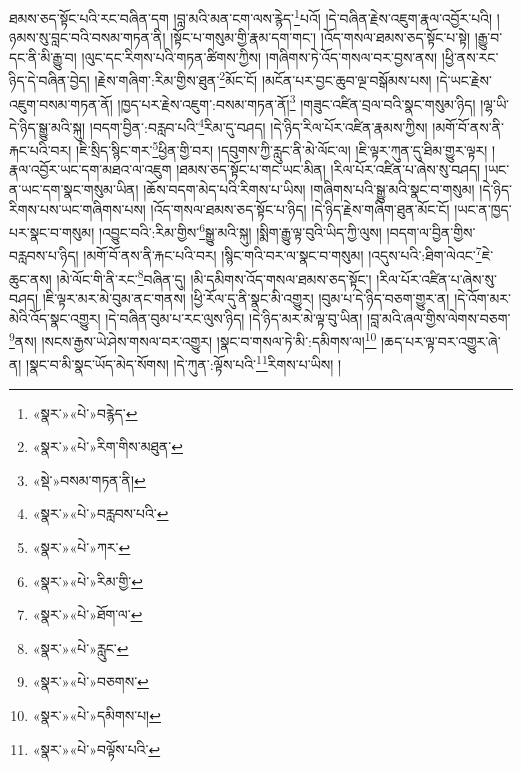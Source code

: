 ཐམས་ཅད་སྟོང་པའི་རང་བཞིན་དག །བླ་མའི་མན་ངག་ལས་རྙེད་\footnote{«སྣར་»«པེ་»བརྙེད་}པའོ། །དེ་བཞིན་རྗེས་འཇུག་རྣལ་འབྱོར་པའི། །ཉམས་སུ་བླང་བའི་བསམ་གཏན་ནི། །སྟོང་པ་གསུམ་གྱི་རྣམ་དག་གང་། །འོད་གསལ་ཐམས་ཅད་སྟོང་པ་སྟེ། །རྒྱུ་བ་དང་ནི་མི་རྒྱུ་བ། །ལུང་དང་རིགས་པའི་གཏན་ཚིགས་ཀྱིས། །གཞིགས་ཏེ་འོད་གསལ་བར་བྱས་ནས། །ཕྱི་ནས་རང་ཉིད་དེ་བཞིན་བྱེད། །རྗེས་གཞིག་:རིམ་གྱིས་ཐུན་\footnote{«སྣར་»«པེ་»རིག་གིས་མཐུན་}མོང་ངོ། །མངོན་པར་བྱང་ཆུབ་ལྔ་བསྒོམས་པས། །དེ་ཡང་རྗེས་འཇུག་བསམ་གཏན་ནོ། །ཁྱད་པར་རྗེས་འཇུག་:བསམ་གཏན་ནོ།\footnote{«སྡེ་»བསམ་གཏན་ནི།} །གཟུང་འཛིན་བྲལ་བའི་སྣང་གསུམ་ཉིད། །ལྷ་ཡི་དེ་ཉིད་སྒྱུ་མའི་སྐུ། །བདག་བྱིན་:བརླབ་པའི་\footnote{«སྣར་»«པེ་»བརླབས་པའི་}རིམ་དུ་བཤད། །དེ་ཉིད་རིལ་པོར་འཛིན་རྣམས་ཀྱིས། །མགོ་བོ་ནས་ནི་རྐང་པའི་བར། །ཇི་སྲིད་སྙིང་གར་\footnote{«སྣར་»«པེ་»ཀར་}ཕྱིན་གྱི་བར། །དབུགས་ཀྱི་རླུང་ནི་མེ་ལོང་ལ། །ཇི་ལྟར་ཀུན་དུ་ཐིམ་གྱུར་ལྟར། །རྣལ་འབྱོར་ཡང་དག་མཐའ་ལ་འཇུག །ཐམས་ཅད་སྟོང་པ་གང་ཡང་མིན། །རིལ་པོར་འཛིན་པ་ཞེས་སུ་བཤད། །ཡང་ན་ཡང་དག་སྣང་གསུམ་ཡིན། །ཆོས་བདག་མེད་པའི་རིགས་པ་ཡིས། །གཞིགས་པའི་སྒྱུ་མའི་སྣང་བ་གསུམ། །དེ་ཉིད་རིགས་པས་ཡང་གཞིགས་པས། །འོད་གསལ་ཐམས་ཅད་སྟོང་པ་ཉིད། །དེ་ཉིད་རྗེས་གཞིག་ཐུན་མོང་ངོ། །ཡང་ན་ཁྱད་པར་སྣང་བ་གསུམ། །འབྱུང་བའི་:རིམ་གྱིས་\footnote{«སྣར་»«པེ་»རིམ་གྱི་}སྒྱུ་མའི་སྐུ། །སྨིག་རྒྱུ་ལྟ་བུའི་ཡིད་ཀྱི་ལུས། །བདག་ལ་བྱིན་གྱིས་བརླབས་པ་ཉིད། །མགོ་བོ་ནས་ནི་རྐང་པའི་བར། །སྙིང་གའི་བར་ལ་སྣང་བ་གསུམ། །འདུས་པའི་:ཐིག་ལེའང་\footnote{«སྣར་»«པེ་»ཐོག་ལ་}ཇེ་ཆུང་ནས། །མེ་ལོང་གི་ནི་རང་\footnote{«སྣར་»«པེ་»རླུང་}བཞིན་དུ། །མི་དམིགས་འོད་གསལ་ཐམས་ཅད་སྟོང་། །རིལ་པོར་འཛིན་པ་ཞེས་སུ་བཤད། །ཇི་ལྟར་མར་མེ་བུམ་ནང་གནས། །ཕྱི་རོལ་དུ་ནི་སྣང་མི་འགྱུར། །བུམ་པ་དེ་ཉིད་བཅག་གྱུར་ན། །དེ་འོག་མར་མེའི་འོད་སྣང་འགྱུར། །དེ་བཞིན་བུམ་པ་རང་ལུས་ཉིད། །དེ་ཉིད་མར་མེ་ལྟ་བུ་ཡིན། །བླ་མའི་ཞལ་གྱིས་ལེགས་བཅག་\footnote{«སྣར་»«པེ་»བཅགས་}ནས། །སངས་རྒྱས་ཡེ་ཤེས་གསལ་བར་འགྱུར། །སྣང་བ་གསལ་ཏེ་མི་:དམིགས་ལ།\footnote{«སྣར་»«པེ་»དམིགས་པ།} །ཆད་པར་ལྟ་བར་འགྱུར་ཞེ་ན། །སྣང་བ་མི་སྣང་ཡོད་མེད་སོགས། །དེ་ཀུན་:ལྟོས་པའི་\footnote{«སྣར་»«པེ་»བལྟོས་པའི་}རིགས་པ་ཡིས། །
